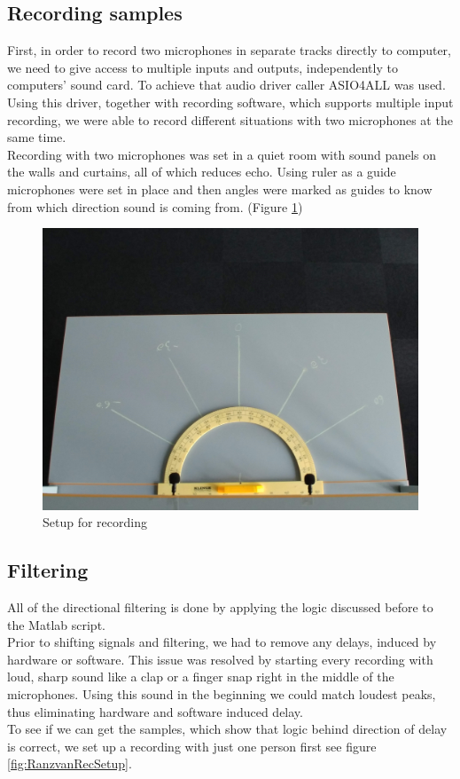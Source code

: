 \subsection{Recording samples}
First, in order to record two microphones in separate tracks directly to computer, we need to give access to multiple inputs and outputs,  
independently to computers' sound card. To achieve that audio driver caller ASIO4ALL was used. Using this driver, together with recording software, 
which supports multiple input recording, we were able to record different situations with two microphones at the same time. \\
Recording with two microphones was set in a quiet room with sound panels on the walls and curtains, all of 
which reduces echo. Using ruler as a guide microphones were set in place and then angles were marked as 
guides to know from which direction sound is coming from. (Figure \ref{fig:recSetup}) 
\begin{figure}[htp]
	\centering
	\includegraphics[width=1\textwidth]{Illustrations/JustSetup.jpg}
	\caption{Setup for recording}
	\label{fig:recSetup}
\end{figure}




\subsection{Filtering}
All of the directional filtering is done by applying the logic discussed before to the Matlab script.\\
Prior to shifting signals and filtering, we had to remove any delays, induced by hardware or software. This 
issue was resolved by starting every recording with loud, sharp sound like a clap or a finger snap right in 
the middle of the microphones. Using this sound in the beginning we could match loudest peaks, thus 
eliminating hardware and software induced delay. \\
To see if we can get the samples, which show that logic behind direction of delay is correct, we set up a 
recording with just one person first see figure \ref{fig:RanzvanRecSetup}.\\

